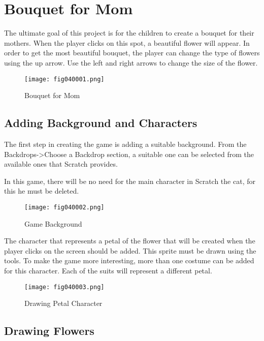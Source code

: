 \chapter{Bouquet for Mom}

The ultimate goal of this project is for the children to create a bouquet for their mothers. When the player clicks on this spot, a beautiful flower will appear. In order to get the most beautiful bouquet, the player can change the type of flowers using the up arrow. Use the left and right arrows to change the size of the flower.

\begin{figure}[H]
   \centering
   \texttt{[image: fig040001.png]}
   \caption{Bouquet for Mom}
\label{fig040001}
\end{figure}

\section{Adding Background and Characters}
The first step in creating the game is adding a suitable background. From the Backdrops->Choose a Backdrop section, a suitable one can be selected from the available ones that Scratch provides.

In this game, there will be no need for the main character in Scratch the cat, for this he must be deleted.

\begin{figure}[H]
   \centering
   \texttt{[image: fig040002.png]}
   \caption{Game Background}
\label{fig040002}
\end{figure}

The character that represents a petal of the flower that will be created when the player clicks on the screen should be added. This sprite must be drawn using the tools. To make the game more interesting, more than one costume can be added for this character. Each of the suits will represent a different petal.

\begin{figure}[H]
   \centering
   \texttt{[image: fig040003.png]}
   \caption{Drawing Petal Character}
\label{fig040003}
\end{figure}

\section{Drawing Flowers}

